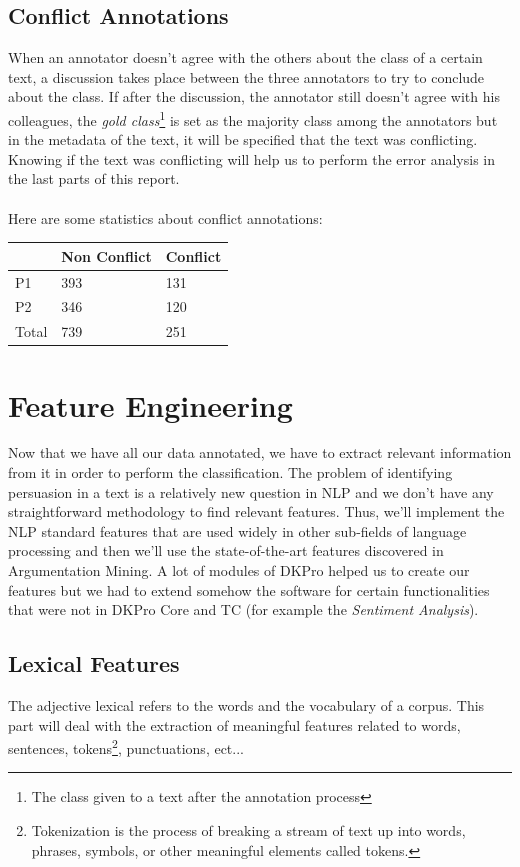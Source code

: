 \subsection{Conflict Annotations}
\label{sec:conflictannotations}
When an annotator doesn't agree with the others about the class of a certain text, a discussion takes place between the three annotators to try to conclude about the class. If after the discussion, the annotator still doesn't agree with his colleagues, the \emph{gold class}\footnote{The class given to a text after the annotation process} is set as the majority class among the annotators but in the metadata of the text, it will be specified that the text was conflicting. Knowing if the text was conflicting will help us to perform the error analysis in the last parts of this report.
\\
\\
Here are some statistics about conflict annotations:
\begin{table}[h]
\centering
\begin{tabular}{|l|l|l|}
\hline
      & Non Conflict & Conflict \\ \hline
P1    & 393          & 131      \\ \hline
P2    & 346          & 120      \\ \hline
Total & 739          & 251      \\ \hline
\end{tabular}
\end{table}
\section{Feature Engineering}
Now that we have all our data annotated, we have to extract relevant information from it in order to perform the classification. The problem of identifying persuasion in a text is a relatively new question in NLP and we don't have any straightforward methodology to find relevant features. Thus, we'll implement the NLP standard features that are used widely in other sub-fields of language processing and then we'll use the state-of-the-art features discovered in Argumentation Mining. A lot of modules of DKPro helped us to create our features but we had to extend somehow the software for certain functionalities that were not in DKPro Core and TC (for example the \emph{Sentiment Analysis}).

\subsection{Lexical Features}   
The adjective lexical refers to the words and the vocabulary of a corpus. This part will deal with the extraction of meaningful features related to words, sentences, \glspl{token}\footnote{Tokenization is the process of breaking a stream of text up into words, phrases, symbols, or other meaningful elements called tokens.}, punctuations, ect...

